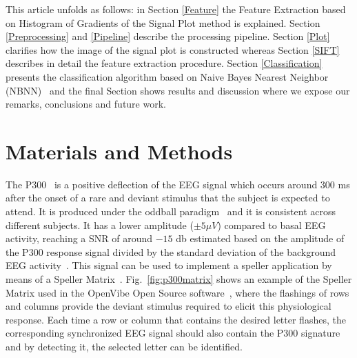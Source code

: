 \documentclass[entropy,article,submit,moreauthors,pdftex,10pt,a4paper]{mdpi}
\begin{document}
This article unfolds as follows: in Section \ref{Feature} the Feature Extraction based on Histogram of Gradients of the Signal Plot method is explained. Section \ref{Preprocessing} and \ref{Pipeline} describe the processing pipeline.  Section \ref{Plot}  clarifies how the image of the signal plot is constructed whereas Section \ref{SIFT}  describes in detail the feature extraction procedure.  Section \ref{Classification}  presents the classification algorithm based on Naive Bayes Nearest Neighbor (NBNN)~\citep{Boiman2008} and the final Section shows results and discussion where we expose our remarks, conclusions and future work.

\section{Materials and Methods}

The P300~\citep{Farwell1988,Knuth2006} is a positive deflection of the EEG signal which occurs around $300$ ms after the onset of a rare and deviant stimulus that the subject is expected to attend.  It is produced under the oddball paradigm~\cite{WolpawJonathanR2012} and it is consistent across different subjects. It has a lower amplitude  ($\pm 5 \mu V $) compared to basal EEG activity, reaching a SNR of around $-15$ db estimated based on the amplitude of the P300 response signal divided by the standard deviation of the background EEG activity~\citep{Hu2010}.  This signal can be used to implement a speller application by means of a Speller Matrix~\citep{Farwell1988}. Fig.~\ref{fig:p300matrix} shows an example of the Speller Matrix used in the OpenVibe Open Source software~\citep{Renard2010}, where the flashings of rows and columns provide the deviant stimulus required to elicit this physiological response.   Each time a row or column that contains the desired letter flashes, the corresponding synchronized EEG signal should also contain the P300 signature and by detecting it, the selected letter can be identified.
\end{document}
